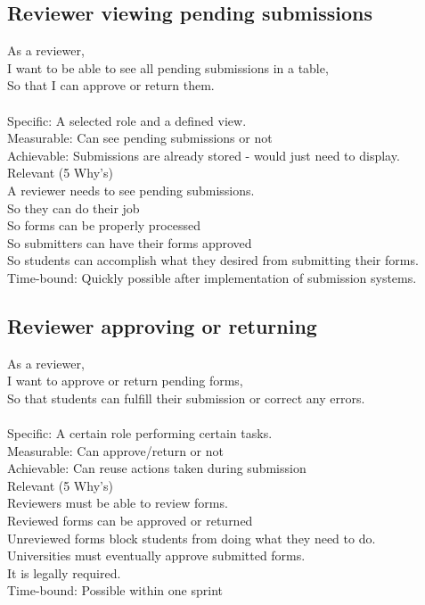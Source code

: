 \documentclass[10pt]{book}
\begin{document}
\begin{landscape}
\section*{Reviewer viewing pending submissions}
As a reviewer,\\
I want to be able to see all pending submissions in a table,\\
So that I can approve or return them.\\
\\
Specific: A selected role and a defined view.\\
Measurable: Can see pending submissions or not\\
Achievable: Submissions are already stored - would just need to display.\\
Relevant (5 Why's)\\
    \indent
    A reviewer needs to see pending submissions.\\
    \indent
    So they can do their job\\
    \indent
    So forms can be properly processed\\
    \indent
    So submitters can have their forms approved\\
    \indent
    So students can accomplish what they desired from submitting their forms.\\
Time-bound: Quickly possible after implementation of submission systems.
\end{landscape}

\begin{landscape}
\section*{Reviewer approving or returning}
As a reviewer,\\
I want to approve or return pending forms,\\
So that students can fulfill their submission or correct any errors.\\
\\
Specific: A certain role performing certain tasks.\\
Measurable: Can approve/return or not\\
Achievable: Can reuse actions taken during submission\\
Relevant (5 Why's)\\
    \indent
    Reviewers must be able to review forms.\\
    \indent
    Reviewed forms can be approved or returned\\
    \indent
    Unreviewed forms block students from doing what they need to do.\\
    \indent
    Universities must eventually approve submitted forms.\\
    \indent
    It is legally required.\\
Time-bound: Possible within one sprint
\end{landscape}
\end{document}
